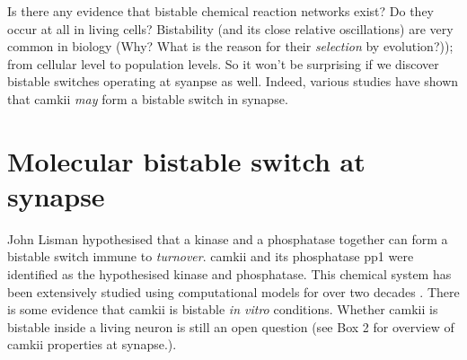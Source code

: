 \documentclass[]{resonance}
\begin{document}
Is there any evidence that bistable chemical reaction networks exist? Do they
occur at all in living cells?  Bistability (and its close relative oscillations)
are very common in biology (Why? What is the reason for their \emph{selection}
by evolution?)); from cellular level to population levels. So it
won't be surprising if we discover bistable switches operating at syanpse as
well. Indeed, various studies have shown that \gls{camkii} \emph{may} form a
bistable switch in synapse.

\section{Molecular bistable switch at synapse}\label{sec:molecular_switch}

John Lisman hypothesised that a kinase and a phosphatase together can form a
bistable switch immune to \emph{turnover}. \gls{camkii} and its phosphatase
\Gls{pp1} were identified as the hypothesised kinase and phosphatase. This
chemical system has been extensively studied using computational models for over
two decades \cite{sandstorm}. There is some evidence that \gls{camkii} is
bistable \emph{in vitro} conditions. Whether \gls{camkii} is bistable
inside a living neuron is still an open question (see Box 2 for overview of
\gls{camkii} properties at synapse.).
\end{document}

